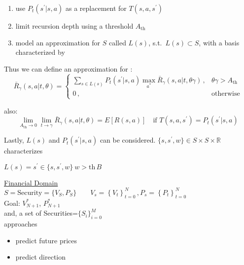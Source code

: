 \begin{enumerate}[resume,label=\circled{\arabic*}]
\item use $P_t( s^\prime | s, a )$ as a replacement for $T( s, a, s^\prime )$
\item limit recursion depth using a threshold $A_{\text{th}}$
\item model an approximation for $S$ called $L(s)$, s.t.\ $L(s) \subset S$, with a basis characterized by 
\end{enumerate}

Thus we can define an approximation for :
\begin{equation*}
\bar{R}_\gamma( s, a|t, \theta ) = \left\{ \begin{array}{cc}
\sum_{s \in L(s)} P_t( s^\prime | s, a ) \max_{a^\ast} \bar{R}_{\gamma}( s, a | t, \theta \gamma )\,, &  \theta \gamma > A_{\text{th}} \\
0\,, & \text{otherwise}
 \end{array}\right.
\end{equation*}

also:
\begin{equation*}
\lim_{A_{\text{th}} \to 0} \lim_{t \to \gamma} \bar{R}_{\gamma}( s, a | t, \theta ) = E\left[ R( s, a ) \right] \quad\text{if\ }T( s, a, s^\prime ) = P_t( s^\prime | s, a ) 
\end{equation*}

Lastly, $L( s )$ and $P_t( s^\prime | s, a )$ can be considered. $\{ s, s^\prime, w \} \in S \times S \times \mathbb{R}$ characterizes

$L( s ) = s^\prime \in \{ s, s^\prime, w \} \ w > \text{th}\,B$ 

\newpage

\underline{Financial Domain}\\

$S = \text{Security} = \{ V_S, P_S \} \qquad V_s = \left\{ V_t \right\}_{t=0}^{N}\,, P_s = \left\{ P_t \right\}_{t=0}^{N}$\\

Goal: $V^\ast_{N+1}$, $P^\ast_{N+1}$\\
and, a set of Securities=$\{ S_i \}_{i=0}^{M}$\\

approaches
\begin{itemize}[label=--]
\item predict future prices
\item predict direction
\end{itemize}
{\ }\\

